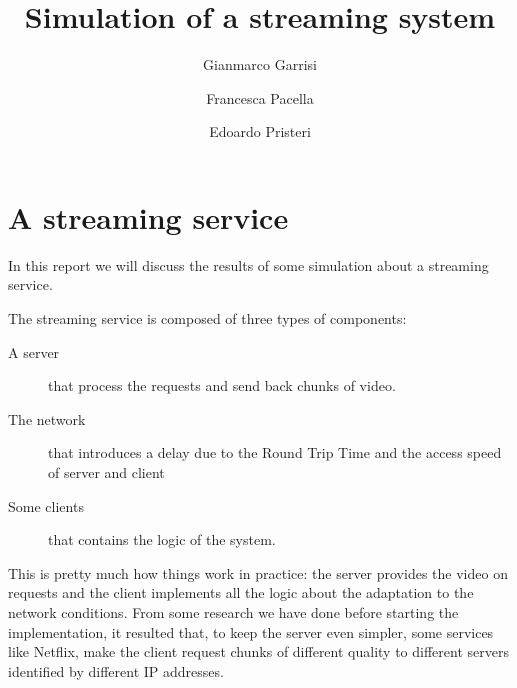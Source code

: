 \documentclass[10pt,a4paper,oneside]{article}
\author{Gianmarco Garrisi \and Francesca Pacella \and Edoardo Pristeri}
\title{Simulation of a streaming system}
\begin{document}
	\maketitle
	\section{A streaming service}
	In this report we will discuss the results of some simulation about a streaming service.
	
	The streaming service is composed of three types of components:
	\begin{description}
		\item[A server] that process the requests and send back chunks of video.
		\item[The network] that introduces a delay due to the Round Trip Time and the access speed of server and client
		\item[Some clients] that contains the logic of the system.
	\end{description}
	
	This is pretty much how things work in practice: the server provides the video on requests and the client implements all the logic about the adaptation to the network conditions. From some research we have done before starting the implementation, it resulted that, to keep the server even simpler, some services like Netflix\texttrademark, make the client request chunks of different quality to different servers identified by different IP addresses.
	
	
	
	
\end{document}
